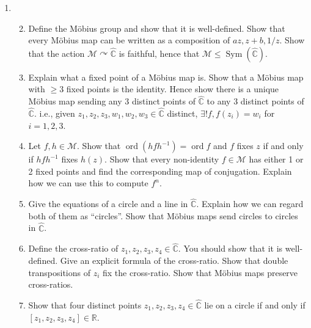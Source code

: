 \documentclass{article}
\newcommand{\mobius}{{M\"{o}bius }}
\newcommand{\mcM}{\mathcal{M}}
\newcommand{\bbC}{\mathbb{C}}
\newcommand{\bbR}{\mathbb{R}}
\newlength{\qspace}
\newcounter{qnumber}
\newenvironment{question}%
 {\vspace{\qspace}
  \begin{enumerate}[\bfseries 1\quad][10]%
    \setcounter{enumi}{\value{qnumber}}%
    \item%
 }
{
  \end{enumerate}
  \filbreak
  \stepcounter{qnumber}
 }
\newenvironment{questionparts}[1][1]%
 {
  \begin{enumerate}[\bfseries (i)]%
    \setcounter{enumii}{#1}
    \addtocounter{enumii}{-1}
    \setlength{\parskip}{3pt}
 }
 {
  \end{enumerate}
 }
\DeclareMathOperator{\ord}{ord}
\DeclareMathOperator{\sym}{Sym}
\def\le{\leqslant}
\def\ge{\geqslant}
\begin{document}
\begin{question}
  \begin{questionparts}
    \item  Define the \mobius group and show that it is well-defined. Show that every \mobius map can be written as a composition of $ az, z+b,1/z $. Show that the action $ \mcM \curvearrowright \hat{\mathbb{C}} $ is faithful, hence that $ \mathcal{M}\le \sym(\hat{\bbC}) $.
    \item Explain what a fixed point of a \mobius map is. Show that a \mobius map with $\ge 3$ fixed points is the identity. Hence show there is a unique \mobius map sending any 3 distinct points of $ \hat{\mathbb{C}} $ to any 3 distinct points of $ \hat{\bbC} $. i.e., given $ z_1,z_2,z_3, w_1,w_2,w_3\in \hat{\bbC} $ distinct, $ \exists ! f, f(z_i)=w_i $ for $i=1,2,3$.
    \item Let $ f,h\in \mcM $. Show that $ \ord(hfh^{-1})=\ord f $ and $ f $ fixes $z$ if and only if $ hfh^{-1} $ fixes $ h(z) $. Show that every non-identity $f\in \mcM$ has either 1 or 2 fixed points and find the corresponding map of conjugation. Explain how we can use this to compute $ f^n $.
    \item Give the equations of a circle and a line in $ \hat{\bbC} $. Explain how we can regard both of them as ``circles''. Show that \mobius maps send circles to circles in $ \hat{\bbC} $.
    \item Define the cross-ratio of $ z_1,z_2,z_3,z_4\in \hat{\bbC} $. You should show that it is well-defined. Give an explicit formula of the cross-ratio. Show that double transpositions of $z_i$ fix the cross-ratio. Show that \mobius maps preserve cross-ratios.
    \item Show that four distinct points $z_1,z_2,z_3,z_4\in \hat{\bbC}$ lie on a circle if and only if $[z_1,z_2,z_3,z_4]\in \bbR$.
  \end{questionparts}
\end{question}
\end{document}
